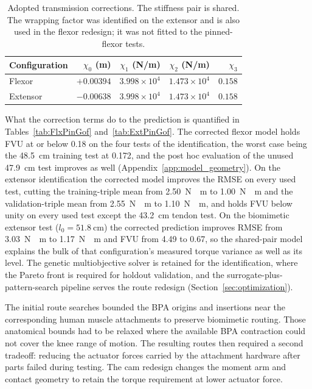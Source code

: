 \begin{table}[htbp]
\centering\small
\caption{Adopted transmission corrections. The stiffness pair is shared. The wrapping factor was identified on the extensor and is also used in the flexor redesign; it was not fitted to the pinned-flexor tests.}
\label{tab:AdoptedXi}
\begin{tabular}{@{}lrrrr@{}}
\toprule
Configuration & $\chi_{0}$ (m) & $\chi_{1}$ (N/m) & $\chi_{2}$ (N/m) & $\chi_{3}$\\
\midrule
Flexor & $+0.00394$ & $3.998\times10^{4}$ & $1.473\times10^{4}$ & $0.158$\\
Extensor & $-0.00638$ & $3.998\times10^{4}$ & $1.473\times10^{4}$ & $0.158$\\
\bottomrule
\end{tabular}
\end{table} What the correction terms do to the prediction is quantified in Tables~\ref{tab:FlxPinGof} and~\ref{tab:ExtPinGof}. The corrected flexor model holds FVU at or below 0.18 on the four tests of the identification, the worst case being the \qty{48.5}{\cm} training test at 0.172, and the post hoc evaluation of the unused \qty{47.9}{\cm} test improves as well (Appendix~\ref{app:model_geometry}). On the extensor identification the corrected model improves the RMSE on every used test, cutting the training-triple mean from \qty{2.50}{\newton\cdot\meter} to \qty{1.00}{\newton\cdot\meter} and the validation-triple mean from \qty{2.55}{\newton\cdot\meter} to \qty{1.10}{\newton\cdot\meter}, and holds FVU below unity on every used test except the \qty{43.2}{\cm} tendon test. On the biomimetic extensor test ($l_{0} = \qty{51.8}{\cm}$) the corrected prediction improves RMSE from \qty{3.03}{\newton\cdot\meter} to \qty{1.17}{\newton\cdot\meter} and FVU from 4.49 to 0.67, so the shared-pair model explains the bulk of that configuration's measured torque variance as well as its level. The genetic multiobjective solver is retained for the identification, where the Pareto front is required for holdout validation, and the surrogate-plus-pattern-search pipeline serves the route redesign (Section~\ref{sec:optimization}).

The initial route searches bounded the BPA origins and insertions near the corresponding human muscle attachments to preserve biomimetic routing. Those anatomical bounds had to be relaxed where the available BPA contraction could not cover the knee range of motion. The resulting routes then required a second tradeoff: reducing the actuator forces carried by the attachment hardware after parts failed during testing. The cam redesign changes the moment arm and contact geometry to retain the torque requirement at lower actuator force.

